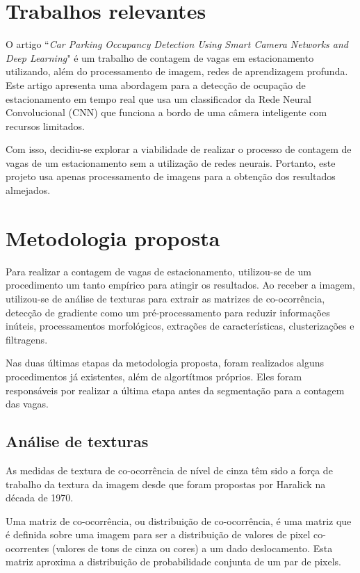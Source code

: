 \documentclass[10pt,twocolumn,letterpaper]{article}
\begin{document}
\section{Trabalhos relevantes}

	O artigo ``{\em Car Parking Occupancy Detection Using Smart Camera Networks
and Deep Learning}" é um trabalho de contagem de vagas em estacionamento utilizando,
além do processamento de imagem, redes de aprendizagem profunda. Este artigo
apresenta uma abordagem para a detecção de ocupação de estacionamento
em tempo real que usa um classificador da Rede Neural Convolucional
(CNN) que funciona a bordo de uma câmera inteligente com recursos limitados.

	Com isso, decidiu-se explorar a viabilidade de realizar o processo de contagem de
vagas de um estacionamento sem a utilização de redes neurais. Portanto, este projeto
usa apenas processamento de imagens para a obtenção dos resultados almejados.




\section{Metodologia proposta}

	Para realizar a contagem de vagas de estacionamento, utilizou-se de um procedimento
um tanto empírico para atingir os resultados. Ao receber a imagem, utilizou-se de análise
de texturas para extrair as matrizes de co-ocorrência, detecção de gradiente como um
pré-processamento para reduzir informações inúteis, processamentos morfológicos,
extrações de características, clusterizações e filtragens.

	Nas duas últimas etapas da metodologia proposta, foram realizados alguns procedimentos
já existentes, além de algortítmos próprios. Eles foram responsáveis por realizar a última etapa
antes da segmentação para a contagem das vagas.

\subsection{Análise de texturas}

	As medidas de textura de co-ocorrência de nível de cinza têm sido a força de trabalho
da textura da imagem desde que foram propostas por Haralick{\footnotesize \cite{haralick}}
na década de 1970.

	Uma matriz de co-ocorrência, ou distribuição de co-ocorrência,{\footnotesize \cite{GLCM-tutorial}}
é uma matriz que é definida sobre uma imagem para ser a distribuição de valores de pixel
co-ocorrentes (valores de tons de cinza ou cores) a um dado deslocamento. Esta matriz
aproxima a distribuição de probabilidade conjunta de um par de pixels.
\end{document}
